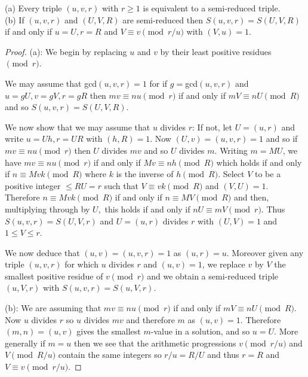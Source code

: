 \documentclass[10pt,a4paper]{amsart}
\renewcommand{\geq}{\geqslant}
\renewcommand{\leq}{\leqslant}
\begin{document}
\begin{lemma}  \label{lem: 1} (a) Every triple $(u,v,r)$ with $r\geq 1$  is equivalent to a semi-reduced triple. \\
(b)   If  $(u,v,r)$ and $(U,V,R)$ are semi-reduced then $S(u,v,r)=S(U,V,R)$ if and only if $u=U, r=R$ and $V\equiv v  \pmod {r/u}$ with $(V,u)=1$.
  \end{lemma}

 \begin{proof}  (a):  We begin by replacing $u$ and $v$ by their least positive residues $\pmod r$.

 We may assume that gcd$(u,v,r)=1$ for if $g=$gcd$(u,v,r)$ and $u=gU, v=gV, r=gR$ then $mv\equiv nu \pmod r$ if and only if $mV\equiv nU \pmod R$ and so $S(u,v,r)=S(U,V,R)$.
 
 
 We now show that we may assume that $u$ divides $r$: If not, let
  $U=(u,r)$ and write $u=Uh, r=UR$ with $(h,R)=1$. Now $(U,v)=(u,v,r)=1$ and so if $mv\equiv nu \pmod r$ then $U$ divides $mv$ and so $U$ divides $m$. Writing $m=MU$, we have $mv\equiv nu \pmod r$ if and only if 
 $Mv\equiv n h \pmod { R}$  which holds  if and only if  $n \equiv M vk \pmod { R}$ where
$k$ is the inverse of $h \pmod R$. %
Select $V$ to be a positive integer $\leq   RU=r$ such that $V\equiv vk \pmod R$ and $(V,U)=1$. Therefore $n \equiv M vk \pmod { R}$ if and only if $n \equiv MV \pmod { R}$ and then, multiplying through by $U,$ this holds if and only if $nU \equiv m V \pmod r$.  Thus $S(u,v,r)=S(U,V,r)$ and  $ U=(u,r)$ divides $r$ with $(U,V)=1$ and  $1\leq V\leq r$.  

We now deduce that $(u,v)=(u,v,r)=1$ as $(u,r)=u$.  Moreover given any  triple $(u,v,r)$ for which $u$ divides $r$ and  $(u,v)=1$, we replace 
$v$ by $V$ the smallest positive residue of $v \pmod r$ and we obtain a semi-reduced triple $(u,V,r)$ with $S(u,v,r)=S(u,V,r)$.
\medskip

(b): We are assuming that $mv\equiv nu \pmod r$ if and only if $mV\equiv nU \pmod R$.
Now $u$ divides $r$ so $u$ divides $mv$ and therefore $m$ as $(u,v)=1$. Therefore $(m,n)=(u,v)$ gives the smallest $m$-value in a solution, and so $u=U$. More generally if $m=u$ then we see that the arithmetic progressions $v  \pmod {r/u}$ and $V \pmod {R/u}$
contain the same integers so $r/u=R/U$ and thus $r=R$ and $V\equiv v \pmod {r/u}$.
   \end{proof}
\end{document}
